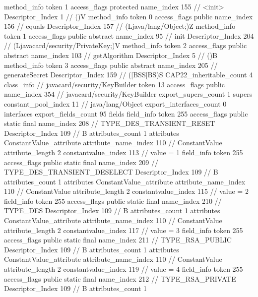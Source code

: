 {{{{{				}
				method_info {
					token	1
					access_flags	protected
					name_index	155		// <init>
					Descriptor_Index	1		// ()V
				}
				method_info {
					token	0
					access_flags	public
					name_index	156		// equals
					Descriptor_Index	157		// (Ljava/lang/Object;)Z
				}
				method_info {
					token	1
					access_flags	public abstract
					name_index	95		// init
					Descriptor_Index	204		// (Ljavacard/security/PrivateKey;)V
				}
				method_info {
					token	2
					access_flags	public abstract
					name_index	103		// getAlgorithm
					Descriptor_Index	5		// ()B
				}
				method_info {
					token	3
					access_flags	public abstract
					name_index	205		// generateSecret
					Descriptor_Index	159		// ([BSS[BS)S
				}
			}
			CAP22_inheritable_count	4
		}
		class_info {		// javacard/security/KeyBuilder
			token	13
			access_flags	public
			name_index	354		// javacard/security/KeyBuilder
			export_supers_count	1
			supers {
				constant_pool_index	11		// java/lang/Object
			}
			export_interfaces_count	0
			interfaces {
			}
			export_fields_count	95
			fields {
			field_info {
				token	255
				access_flags	public static final
				name_index	208		// TYPE_DES_TRANSIENT_RESET
				Descriptor_Index	109		// B
				attributes_count	1
				attributes {
				ConstantValue_attribute {
					attribute_name_index	110		// ConstantValue
					attribute_length	2
					constantvalue_index	113		// value = 1
				}
				}
			}
			field_info {
				token	255
				access_flags	public static final
				name_index	209		// TYPE_DES_TRANSIENT_DESELECT
				Descriptor_Index	109		// B
				attributes_count	1
				attributes {
				ConstantValue_attribute {
					attribute_name_index	110		// ConstantValue
					attribute_length	2
					constantvalue_index	115		// value = 2
				}
				}
			}
			field_info {
				token	255
				access_flags	public static final
				name_index	210		// TYPE_DES
				Descriptor_Index	109		// B
				attributes_count	1
				attributes {
				ConstantValue_attribute {
					attribute_name_index	110		// ConstantValue
					attribute_length	2
					constantvalue_index	117		// value = 3
				}
				}
			}
			field_info {
				token	255
				access_flags	public static final
				name_index	211		// TYPE_RSA_PUBLIC
				Descriptor_Index	109		// B
				attributes_count	1
				attributes {
				ConstantValue_attribute {
					attribute_name_index	110		// ConstantValue
					attribute_length	2
					constantvalue_index	119		// value = 4
				}
				}
			}
			field_info {
				token	255
				access_flags	public static final
				name_index	212		// TYPE_RSA_PRIVATE
				Descriptor_Index	109		// B
				attributes_count	1
}}}}}
